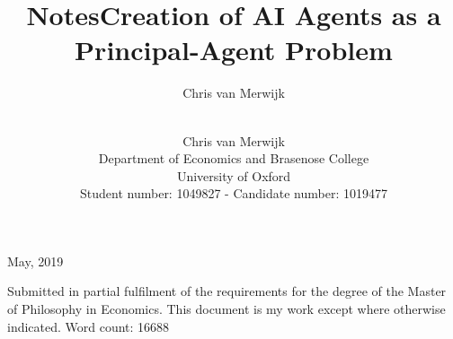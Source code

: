 \documentclass[a4paper,12pt]{article}
\title{Notes}
\author{Chris van Merwijk}
\author{%
	\vspace{1.5cm} \\
  Chris van Merwijk \\
	Department of Economics and Brasenose College\\
	University of Oxford \\
	Student number: 1049827 - 
	Candidate number: 1019477
	\vspace{2cm} \\
}
\title{\textbf{Creation of AI Agents as a Principal-Agent Problem}}
\date{}
\theoremstyle{definition}
\begin{document}
\maketitle
\thispagestyle{empty}

\begin{center}
	{\Large May, 2019} \\
\end{center}

\vspace{5cm}

\normalsize{Submitted in partial fulfilment of the requirements for the degree of the Master of Philosophy in Economics. This document is my work except where otherwise indicated. Word count: 16688 }
\end{document}
